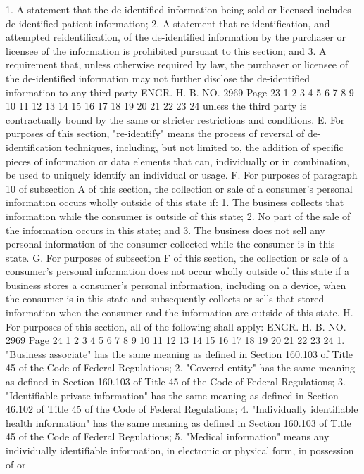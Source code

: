 1. A statement that the de-identified information being sold or
licensed includes de-identified patient information;
2. A statement that re-identification, and attempted reidentification, of the de-identified information by the purchaser or
licensee of the information is prohibited pursuant to this section;
and
3. A requirement that, unless otherwise required by law, the
purchaser or licensee of the de-identified information may not
further disclose the de-identified information to any third party 
ENGR. H. B. NO. 2969 Page 23
1
2
3
4
5
6
7
8
9
10
11
12
13
14
15
16
17
18
19
20
21
22
23
24
unless the third party is contractually bound by the same or
stricter restrictions and conditions.
E. For purposes of this section, "re-identify" means the
process of reversal of de-identification techniques, including, but
not limited to, the addition of specific pieces of information or
data elements that can, individually or in combination, be used to
uniquely identify an individual or usage.
F. For purposes of paragraph 10 of subsection A of this
section, the collection or sale of a consumer's personal information
occurs wholly outside of this state if:
1. The business collects that information while the consumer is
outside of this state;
2. No part of the sale of the information occurs in this state;
and
3. The business does not sell any personal information of the
consumer collected while the consumer is in this state.
G. For purposes of subsection F of this section, the collection
or sale of a consumer's personal information does not occur wholly
outside of this state if a business stores a consumer's personal
information, including on a device, when the consumer is in this
state and subsequently collects or sells that stored information
when the consumer and the information are outside of this state.
H. For purposes of this section, all of the following shall
apply:
ENGR. H. B. NO. 2969 Page 24
1
2
3
4
5
6
7
8
9
10
11
12
13
14
15
16
17
18
19
20
21
22
23
24
1. "Business associate" has the same meaning as defined in
Section 160.103 of Title 45 of the Code of Federal Regulations;
2. "Covered entity" has the same meaning as defined in Section
160.103 of Title 45 of the Code of Federal Regulations;
3. "Identifiable private information" has the same meaning as
defined in Section 46.102 of Title 45 of the Code of Federal
Regulations;
4. "Individually identifiable health information" has the same
meaning as defined in Section 160.103 of Title 45 of the Code of
Federal Regulations;
5. "Medical information" means any individually identifiable
information, in electronic or physical form, in possession of or
